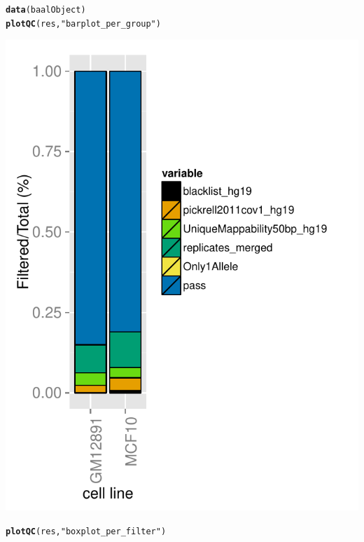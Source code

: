 \documentclass{article}\usepackage[]{graphicx}\usepackage[usenames,dvipsnames]{color}
\makeatletter
\def\maxwidth{ %
  \ifdim\Gin@nat@width>\linewidth
    \linewidth
  \else
    \Gin@nat@width
  \fi
}
\newcommand{\hlstr}[1]{\textcolor[rgb]{0.192,0.494,0.8}{#1}}%
\newcommand{\hlstd}[1]{\textcolor[rgb]{0.345,0.345,0.345}{#1}}%
\newcommand{\hlkwd}[1]{\textcolor[rgb]{0.737,0.353,0.396}{\textbf{#1}}}%
\newenvironment{kframe}{%
 \def\at@end@of@kframe{}%
 \ifinner\ifhmode%
  \def\at@end@of@kframe{\end{minipage}}%
  \begin{minipage}{\columnwidth}%
 \fi\fi%
 \def\FrameCommand##1{\hskip\@totalleftmargin \hskip-\fboxsep
 \colorbox{shadecolor}{##1}\hskip-\fboxsep
     \hskip-\linewidth \hskip-\@totalleftmargin \hskip\columnwidth}%
 \MakeFramed {\advance\hsize-\width
   \@totalleftmargin\z@ \linewidth\hsize
   \@setminipage}}%
 {\par\unskip\endMakeFramed%
 \at@end@of@kframe}
\newenvironment{knitrout}{}{} %
\makeatother
\begin{document}
\begin{knitrout}
\color{fgcolor}\begin{kframe}
\begin{alltt}
\hlkwd{data}\hlstd{(baalObject)}
\hlkwd{plotQC}\hlstd{(res,} \hlstr{"barplot_per_group"}\hlstd{)}
\end{alltt}
\end{kframe}

{\centering \includegraphics[width=\maxwidth]{figure/QCplots-1} 

}


\begin{kframe}\begin{alltt}
\hlkwd{plotQC}\hlstd{(res,} \hlstr{"boxplot_per_filter"}\hlstd{)}
\end{alltt}
\end{kframe}


\end{knitrout}
\end{document}
